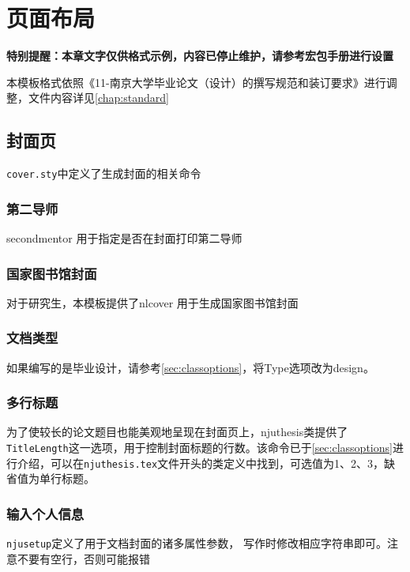 \chapter{页面布局}

\textbf{特别提醒：本章文字仅供格式示例，内容已停止维护，请参考宏包手册进行设置}

本模板格式依照《11-南京大学毕业论文（设计）的撰写规范和装订要求》进行调整，文件内容详见\cref{chap:standard}

\section{封面页}


\texttt{cover.sty}中定义了生成封面的相关命令


\subsection{第二导师}

secondmentor 用于指定是否在封面打印第二导师

\subsection{国家图书馆封面}

对于研究生，本模板提供了nlcover 用于生成国家图书馆封面

\subsection{文档类型}

如果编写的是毕业设计，请参考\cref{sec:classoptions}，将Type选项改为design。
\subsection{多行标题}

为了使较长的论文题目也能美观地呈现在封面页上，njuthesis类提供了\texttt{TitleLength}这一选项，用于控制封面标题的行数。该命令已于\cref{sec:classoptions}进行介绍，可以在\texttt{njuthesis.tex}文件开头的类定义中找到，可选值为1、2、3，缺省值为单行标题。


\subsection{输入个人信息}

\texttt{njusetup}定义了用于文档封面的诸多属性参数，
写作时修改相应字符串即可。注意不要有空行，否则可能报错


